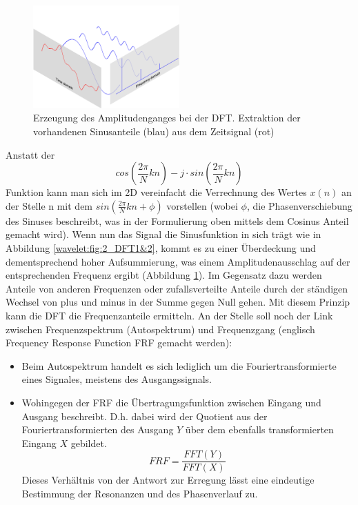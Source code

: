 \begin{figure}
	\centering
	\includegraphics[width=0.5\textwidth]{papers/wavelets/images/3_AmplitudengangExtraktionDFT.png}
	\caption{Erzeugung des Amplitudenganges bei der DFT. Extraktion der vorhandenen Sinusanteile (blau) aus dem Zeitsignal (rot) }
	\label{wavelet:fig:AmplitudengangExtraktionDFT}
\end{figure}

Anstatt der \[cos(\frac{2\pi}{N}kn)-j\cdot sin(\frac{2\pi}{N}kn)\] Funktion kann man sich im 2D vereinfacht die Verrechnung des Wertes $x(n)$ an der Stelle n mit dem $sin(\frac{2\pi}{N}kn+\phi)$ vorstellen (wobei $\phi$, die Phasenverschiebung des Sinuses beschreibt, was in der Formulierung oben mittels dem Cosinus Anteil gemacht wird). Wenn nun das Signal die Sinusfunktion in sich trägt wie in Abbildung \ref{wavelet:fig:2_DFT1&2}, kommt es zu einer Überdeckung und dementsprechend hoher Aufsummierung, was einem Amplitudenausschlag auf der entsprechenden Frequenz ergibt (Abbildung \ref{wavelet:fig:AmplitudengangExtraktionDFT}). Im Gegensatz dazu werden Anteile von anderen Frequenzen oder zufallsverteilte Anteile durch der ständigen Wechsel von plus und minus in der Summe gegen Null gehen. Mit diesem Prinzip kann die DFT die Frequenzanteile ermitteln.
An der Stelle soll noch der Link zwischen Frequenzspektrum (Autospektrum) und Frequenzgang (englisch Frequency Response Function FRF gemacht werden):

\begin{itemize}
	\item Beim Autospektrum handelt es sich lediglich um die Fouriertransformierte eines Signales, meistens des Ausgangssignals.
	\item Wohingegen der FRF die Übertragungsfunktion zwischen Eingang und Ausgang beschreibt. D.h. dabei wird der Quotient aus der Fouriertransformierten des Ausgang $Y$ über dem ebenfalls transformierten Eingang $X$ gebildet. \[FRF = \frac{FFT(Y)}{FFT(X)}\]
	Dieses Verhältnis von der Antwort zur Erregung lässt eine eindeutige Bestimmung der Resonanzen und des Phasenverlauf zu.
\end{itemize}

